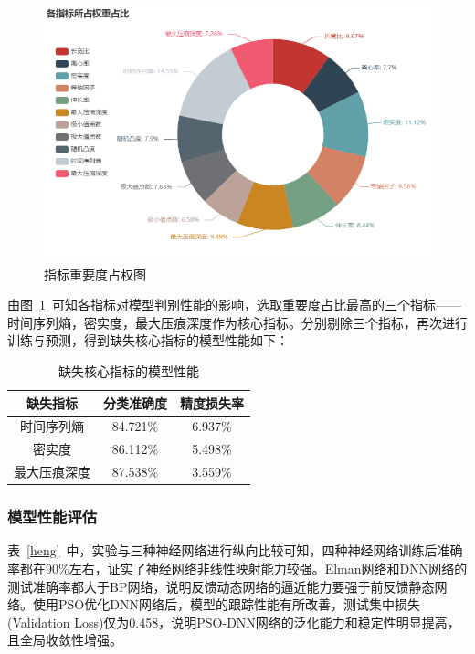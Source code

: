 \documentclass{whutmod}
\begin{document}
	\begin{figure}
	\centering
	\includegraphics[width=\textwidth]{figures/quanzhong2.png}
	\caption{指标重要度占权图}\label{quanzhong}
		
\end{figure}

	由图~\ref{quanzhong}~可知各指标对模型判别性能的影响，选取重要度占比最高的三个指标——时间序列熵，密实度，最大压痕深度作为核心指标。分别剔除三个指标，再次进行训练与预测，得到缺失核心指标的模型性能如下：
	
		\begin{table}[H]
		\centering	\caption{缺失核心指标的模型性能}\label{hengl}
		\begin{tabular}{ccc}
			\toprule[2pt]
			\multicolumn{1}{m{3cm}}{\centering 缺失指标}
			& \multicolumn{1}{m{3cm}}{\centering 分类准确度}
			&\multicolumn{1}{m{3cm}}{\centering 精度损失率}
			\\
			\midrule[1pt]
			时间序列熵	 & 84.721\%  &6.937\%  \\ 
			密实度	 &  86.112\% &5.498\%  \\ 
			最大压痕深度	 &  87.538\% &  3.559\%  \\ 
		
			\bottomrule[2pt]	
		\end{tabular}
		
	\end{table}

	\subsubsection{模型性能评估}
	表~\ref{heng}~中，实验与三种神经网络进行纵向比较可知，四种神经网络训练后准确率都在90\%左右，证实了神经网络非线性映射能力较强。Elman网络和DNN网络的测试准确率都大于BP网络，说明反馈动态网络的逼近能力要强于前反馈静态网络。使用PSO优化DNN网络后，模型的跟踪性能有所改善，测试集中损失(Validation Loss)仅为0.458，说明PSO-DNN网络的泛化能力和稳定性明显提高，且全局收敛性增强。
	
\end{document}
